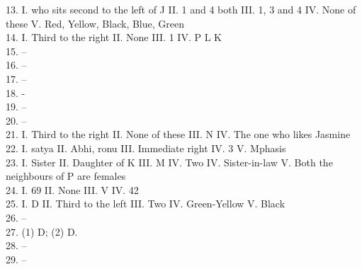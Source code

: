 \documentclass[
]{article}
\begin{document}
13. I. who sits second to the left of J \hspace{2mm}II. 1 and 4 both \hspace{2mm}III. 1, 3 and 4 \hspace{2mm}IV. None of these \hspace{2mm}V. Red, Yellow, Black, Blue, Green\\
14. I. Third to the right \hspace{2mm}II. None \hspace{2mm}III. 1 \hspace{2mm}IV. P L K\\
15. –\\
16. –\\
17. –\\
18. -\\
19. –\\
20. –\\
21. I. Third to the right \hspace{2mm}II. None of these \hspace{2mm}III. N \hspace{2mm}IV. The one who likes Jasmine\\
22. I. satya \hspace{2mm}II. Abhi, ronu \hspace{2mm}III. Immediate right \hspace{2mm}IV. 3 \hspace{2mm}V. Mphasis\\
23. I. Sister \hspace{2mm}II. Daughter of K \hspace{2mm}III. M \hspace{2mm}IV. Two \hspace{2mm}IV. Sister-in-law \hspace{2mm}V. Both the neighbours of P are females\\
24. I. 69 \hspace{2mm}II. None \hspace{2mm}III. V \hspace{2mm}IV. 42\\
25. I. D \hspace{2mm}II. Third to the left \hspace{2mm}III. Two \hspace{2mm}IV. Green-Yellow \hspace{2mm}V. Black\\
26. –\\
27. (1) D; \hspace{2mm}(2) D.\\
28. –\\
29. –\\
\end{document}
